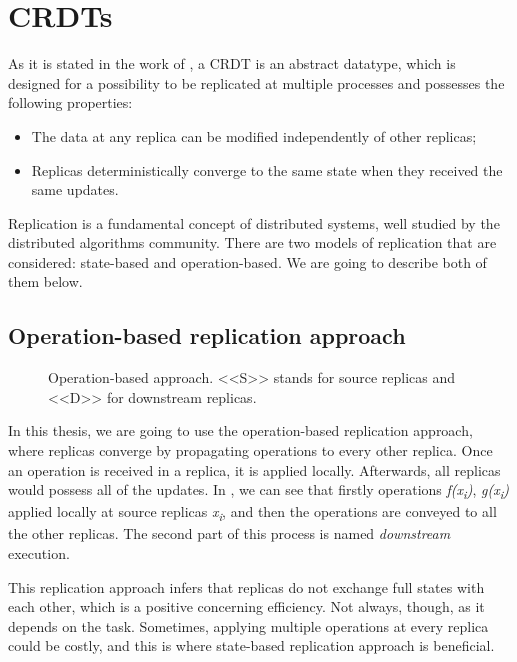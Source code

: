 \section{CRDTs}
\label{2-crdts}

As it is stated in the work of \citet{3}, a CRDT is an abstract datatype, which is designed for a possibility to be replicated at multiple processes and possesses the following properties:


    \begin{itemize}
        \item {The data at any replica can be modified independently of other replicas;}
        \item {Replicas deterministically converge to the same state when they received the same updates.}
    \end{itemize}

Replication is a fundamental concept of distributed systems, well studied by the distributed algorithms community\cite{2}. There are two models of replication that are considered: state-based and operation-based. We are going to describe both of them below. 

\subsection*{Operation-based replication approach}

\begin{figure}[!htb]
    \begin{center}
    \def\svgwidth{\linewidth}
    
    \caption {Operation-based approach\cite{2}. <<S>> stands for source replicas and <<D>> for downstream replicas. }
    \label{fig:theory1}
\end{center}
\end{figure}

In this thesis, we are going to use the operation-based replication approach, where replicas converge by propagating operations to every other replica\cite{3}. Once an operation is received in a replica, it is applied locally. Afterwards, all replicas would possess all of the updates. In , we can see that firstly operations \textit{f(x\textsubscript{i})}, \textit{g(x\textsubscript{i})} applied locally at source replicas \textit{x\textsubscript{i}}, and then the operations are conveyed to all the other replicas. The second part of this process is named \textit{downstream} execution.

This replication approach infers that replicas do not exchange full states with each other, which is a positive concerning efficiency. Not always, though, as it depends on the task. Sometimes, applying multiple operations at every replica could be costly, and this is where state-based replication approach is beneficial.

